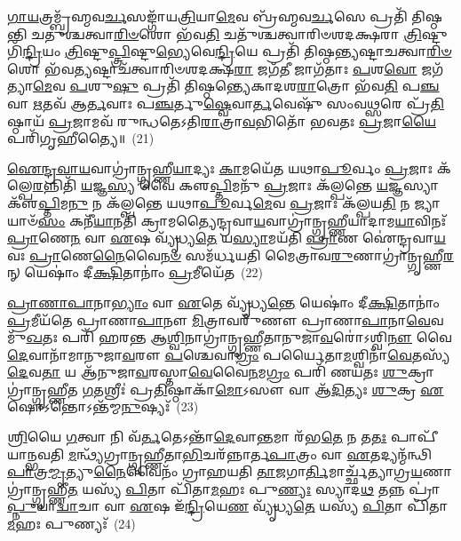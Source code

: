 \-\ul{𑌗𑌾}\-\-\ul{𑌯}\-𑌤𑍍𑌰𑌮𑍍𑌬𑍍𑌰᳴𑌹𑍍𑌮𑌵\-\ul{𑌰𑍍𑌚}\-𑌸𑌙𑍍𑌗𑌾᳴𑌯\-\ul{𑌤𑍍𑌰𑌿}\-𑌯𑌾\-\ul{𑌮𑍇}\-𑌵 𑌬𑍍𑌰᳴𑌹𑍍𑌮𑌵\-\ul{𑌰𑍍𑌚}\-𑌸𑍇 𑌪𑍍𑌰𑌤𑌿᳴ 𑌤𑌿𑌷𑍍𑌠𑌨𑍍𑌤𑌿 𑌚𑌤𑍁𑌶𑍍𑌚𑌤𑍍𑌵𑌾\-\ul{𑌰𑌿}\-\-\ul{𑍞}\-𑌶𑍋 𑌭᳴𑌵\-\ul{𑌤𑌿} 𑌚𑌤𑍁᳴𑌶𑍍𑌚𑌤𑍍𑌵𑌾𑌰𑌿𑍞𑌶𑌦𑌕𑍍𑌷𑌰𑌾 \ul{𑌤𑍍𑌰𑌿}\-𑌷𑍍𑌟𑍁𑌗𑌿᳴\-\ul{𑌨𑍍𑌦𑍍𑌰𑌿}\-𑌯𑌂 \ul{𑌤𑍍𑌰𑌿}\-𑌷𑍍𑌟𑍁\-\ul{𑌪𑍍𑌤𑍍𑌰𑌿}\-𑌷𑍍𑌟𑍁\-\ul{𑌭𑍍𑌯𑍇}\-𑌵𑍇\-\ul{𑌨𑍍𑌦𑍍𑌰𑌿}\-𑌯𑍇 𑌪𑍍𑌰𑌤𑌿᳴ 𑌤𑌿𑌷𑍍𑌠𑌨𑍍𑌤𑍍𑌯𑌷𑍍𑌟𑌾𑌚𑌤𑍍𑌵𑌾\-\ul{𑌰𑌿}\-\-\ul{𑍞}\-𑌶𑍋 𑌭᳴𑌵\-\ul{𑌤𑍍𑌯}\-𑌷𑍍𑌟𑌾𑌚᳴𑌤𑍍𑌵𑌾𑌰𑌿𑍞𑌶𑌦𑌕𑍍𑌷\-\ul{𑌰𑌾} 𑌜𑌗᳴\-\ul{𑌤𑍀} 𑌜𑌾𑌗᳴𑌤𑌾𑌃 \ul{𑌪}\-𑌶\-\ul{𑌵𑍋} 𑌜𑌗᳴𑌤𑍍𑌯𑌾\-\ul{𑌮𑍇}\-𑌵 \ul{𑌪}\-𑌶𑍁\-\ul{𑌷𑍁} 𑌪𑍍𑌰𑌤𑌿᳴ 𑌤𑌿𑌷𑍍𑌠𑌨𑍍𑌤𑍍𑌯𑍇𑌕𑌾𑌦𑌶\-\ul{𑌰𑌾}\-𑌤𑍍𑌰𑍋 𑌭᳴𑌵\-\ul{𑌤𑌿} 𑌪\-\ul{𑌞𑍍𑌚} 𑌵𑌾 \ul{𑌋}\-𑌤𑌵᳴ 𑌆\-\ul{𑌰𑍍𑌤}\-𑌵𑌾𑌃 𑌪\-\ul{𑌞𑍍𑌚}\-𑌰𑍍𑌤𑍁\-\ul{𑌷𑍍𑌵𑍇}\-𑌵𑌾\-\ul{𑌰𑍍𑌤}\-𑌵𑍇𑌷𑍁᳴ 𑌸𑌂𑌵\-\ul{𑌥𑍍𑌸}\-𑌰𑍇 𑌪𑍍𑌰᳴\-\ul{𑌤𑌿}\-𑌷𑍍𑌠𑌾𑌯᳴ \ul{𑌪𑍍𑌰}\-𑌜𑌾𑌮𑌵᳴ 𑌰𑍁𑌨𑍍𑌧𑌤𑍇\-𑌽𑌤𑌿\-\ul{𑌰𑌾}\-𑌤𑍍𑌰𑌾\-\ul{𑌵}\-𑌭𑌿𑌤𑍋᳴ 𑌭𑌵𑌤𑌃 \ul{𑌪𑍍𑌰}\-𑌜𑌾\-\ul{𑌯𑍈} 𑌪𑌰𑌿᳴𑌗𑍃𑌹𑍀𑌤𑍍𑌯𑍈॥~(21)

{\anuvakamend[{𑌤𑌸𑍍𑌮𑌾॑𑌦𑍍𑌗𑌾\-\ul{𑌯}\-𑌤𑍍𑌰𑍍𑌯𑍇\-\ul{𑌕𑌾}\-𑌨𑍍𑌨𑌪᳴\-\ul{𑌞𑍍𑌚𑌾}\-𑌶𑌚𑍍𑌚᳴}]}%

\-\ul{𑌐}\-\-\ul{𑌨𑍍𑌦𑍍𑌰}\-\-\ul{𑌵𑌾}\-\-\ul{𑌯}\-𑌵𑌾𑌗𑍍𑌰𑌾॑𑌨𑍍𑌗𑍃𑌹𑍍𑌣𑍀\-\ul{𑌯𑌾}\-𑌦𑍍𑌯𑌃 \ul{𑌕𑌾}\-𑌮𑌯𑍇᳴𑌤 𑌯𑌥𑌾\-\ul{𑌪𑍂}\-𑌰𑍍𑌵𑌂 \ul{𑌪𑍍𑌰}\-𑌜𑌾𑌃 𑌕᳴𑌲𑍍𑌪𑍇\-\ul{𑌰}\-𑌨𑍍𑌨𑌿𑌤𑌿᳴ \ul{𑌯}\-𑌜𑍍𑌞\-\ul{𑌸𑍍𑌯} 𑌵𑍈 𑌕𑍢\-\ul{𑌪𑍍𑌤𑌿}\-𑌮𑌨𑍁᳴ \ul{𑌪𑍍𑌰}\-𑌜𑌾𑌃 𑌕᳴𑌲𑍍𑌪𑌨𑍍𑌤𑍇 \ul{𑌯}\-𑌜𑍍𑌞𑌸𑍍𑌯𑌾𑌕𑍢᳴\-\ul{𑌪𑍍𑌤𑌿}\-𑌮\-\ul{𑌨𑍁} 𑌨 𑌕᳴𑌲𑍍𑌪𑌨𑍍𑌤𑍇 𑌯𑌥𑌾\-\ul{𑌪𑍂}\-𑌰𑍍𑌵\-\ul{𑌮𑍇}\-𑌵 \ul{𑌪𑍍𑌰}\-𑌜𑌾𑌃 𑌕᳴𑌲𑍍𑌪𑌯\-\ul{𑌤𑌿} 𑌨 𑌜𑍍𑌯𑌾𑌯𑌾𑍞᳴\-\ul{𑌸𑌂} 𑌕𑌨𑍀᳴\-\ul{𑌯𑌾}\-𑌨𑌤𑌿᳴ 𑌕𑍍𑌰𑌾𑌮𑌤𑍍𑌯𑍈𑌨𑍍𑌦𑍍𑌰𑌵𑌾\-\ul{𑌯}\-𑌵𑌾𑌗𑍍𑌰𑌾॑𑌨𑍍𑌗𑍃𑌹𑍍𑌣𑍀𑌯𑌾𑌦𑌾𑌮\-\ul{𑌯𑌾}\-𑌵𑌿𑌨𑌃᳴ \ul{𑌪𑍍𑌰𑌾}\-𑌣𑍇\-\ul{𑌨} 𑌵𑌾 \ul{𑌏}\-𑌷 𑌵𑍍𑌯𑍃᳴𑌧𑍍𑌯\-\ul{𑌤𑍇} 𑌯\-\ul{𑌸𑍍𑌯𑌾}\-𑌮𑌯᳴𑌤𑌿 \ul{𑌪𑍍𑌰𑌾}\-𑌣 𑌐॑𑌨𑍍𑌦𑍍𑌰𑌵𑌾\-\ul{𑌯}\-𑌵𑌃 \ul{𑌪𑍍𑌰𑌾}\-𑌣𑍇\-\ul{𑌨𑍈}\-𑌵𑍈\-\ul{𑌨}\-\-\ul{𑍞} 𑌸𑌮᳴𑌰𑍍𑌧𑌯𑌤𑌿 𑌮𑍈𑌤𑍍𑌰𑌾𑌵\-\ul{𑌰𑍁}\-𑌣𑌾𑌗𑍍𑌰𑌾॑𑌨𑍍𑌗𑍃𑌹𑍍𑌣𑍀\-\ul{𑌰}\-𑌨𑍍 𑌯𑍇𑌷𑌾𑌂॑ 𑌦𑍀\-\ul{𑌕𑍍𑌷𑌿}\-𑌤𑌾𑌨𑌾𑌂॑ \ul{𑌪𑍍𑌰}\-𑌮𑍀𑌯𑍇᳴𑌤~(22)

\-\ul{𑌪𑍍𑌰𑌾}\-\-\ul{𑌣𑌾}\-\-\ul{𑌪𑌾}\-𑌨𑌾\-\ul{𑌭𑍍𑌯𑌾𑌂} 𑌵𑌾 \ul{𑌏}\-𑌤𑍇 𑌵𑍍𑌯𑍃᳴𑌧𑍍𑌯\-\ul{𑌨𑍍𑌤𑍇} 𑌯𑍇𑌷𑌾𑌂॑ 𑌦𑍀\-\ul{𑌕𑍍𑌷𑌿}\-𑌤𑌾𑌨𑌾𑌂॑ \ul{𑌪𑍍𑌰}\-𑌮𑍀𑌯᳴𑌤𑍇 𑌪𑍍𑌰𑌾𑌣𑌾\-\ul{𑌪𑌾}\-𑌨𑍗 \ul{𑌮𑌿}\-𑌤𑍍𑌰𑌾𑌵𑌰𑍁᳴𑌣𑍗 𑌪𑍍𑌰𑌾𑌣𑌾\-\ul{𑌪𑌾}\-𑌨𑌾\-\ul{𑌵𑍇}\-𑌵 𑌮𑍁᳴\-\ul{𑌖}\-𑌤𑌃 𑌪𑌰𑌿᳴ 𑌹𑌰𑌨𑍍𑌤 𑌆\-\ul{𑌶𑍍𑌵𑌿}\-𑌨𑌾𑌗𑍍𑌰𑌾॑𑌨𑍍𑌗𑍃𑌹𑍍𑌣𑍀𑌤𑌾𑌨𑍁𑌜𑌾\-\ul{𑌵}\-𑌰𑍋॑\-𑌽𑌶𑍍𑌵𑌿\-\ul{𑌨𑍗} 𑌵𑍈 \ul{𑌦𑍇}\-𑌵𑌾𑌨𑌾᳴𑌮𑌾𑌨𑍁𑌜𑌾\-\ul{𑌵}\-𑌰𑍗 \ul{𑌪}\-𑌶𑍍𑌚𑍇𑌵𑌾\-\ul{𑌗𑍍𑌰𑌂} 𑌪𑌰𑍍𑌯𑍈𑌤𑌾\-\ul{𑌮}\-𑌶𑍍𑌵𑌿𑌨𑌾᳴\-\ul{𑌵𑍇}\-𑌤𑌸𑍍𑌯᳴ \ul{𑌦𑍇}\-𑌵\-\ul{𑌤𑌾} 𑌯 𑌆᳴𑌨𑍁𑌜𑌾\-\ul{𑌵}\-𑌰𑌸𑍍𑌤𑌾\-\ul{𑌵𑍇}\-𑌵𑍈\-\ul{𑌨}\-𑌮\-\ul{𑌗𑍍𑌰𑌂} 𑌪𑌰𑌿᳴ 𑌣𑌯𑌤𑌃 \ul{𑌶𑍁}\-𑌕𑍍𑌰𑌾𑌗𑍍𑌰𑌾॑𑌨𑍍𑌗𑍃𑌹𑍍𑌣𑍀𑌤 \ul{𑌗}\-𑌤𑌶𑍍𑌰𑍀𑌃॑ 𑌪𑍍𑌰\-\ul{𑌤𑌿}\-𑌷𑍍𑌠𑌾𑌕𑌾᳴\-\ul{𑌮𑍋}\-\-𑌽𑌸𑍗 𑌵𑌾 𑌆᳴\-\ul{𑌦𑌿}\-𑌤𑍍𑌯𑌃 \ul{𑌶𑍁}\-𑌕𑍍𑌰 \ul{𑌏}\-𑌷𑍋\-𑌽𑌨𑍍𑌤𑍋\-𑌽𑌨𑍍𑌤᳴𑌮𑍍𑌮\-\ul{𑌨𑍁}\-𑌷𑍍𑌯𑌃᳴~(23)

\-\ul{𑌶𑍍𑌰𑌿}\-𑌯𑍈 \ul{𑌗}\-𑌤𑍍𑌵𑌾 𑌨𑌿 𑌵᳴\-\ul{𑌰𑍍𑌤}\-𑌤𑍇\-𑌽𑌨𑍍𑌤𑌾᳴\-\ul{𑌦𑍇}\-𑌵𑌾\-\ul{𑌨𑍍𑌤}\-𑌮𑌾 𑌰᳴𑌭\-\ul{𑌤𑍇} 𑌨 𑌤\-\ul{𑌤𑌃} 𑌪𑌾𑌪𑍀᳴𑌯𑌾𑌨𑍍𑌭𑌵𑌤𑌿 \ul{𑌮}\-𑌨𑍍𑌥𑍍𑌯᳴𑌗𑍍𑌰𑌾𑌨𑍍𑌗𑍃𑌹𑍍𑌣𑍀𑌤𑌾\-\ul{𑌭𑌿}\-𑌚𑌰᳴𑌨𑍍𑌨𑌾𑌰𑍍𑌤\-\ul{𑌪𑌾}\-𑌤𑍍𑌰𑌂 𑌵𑌾 \ul{𑌏}\-𑌤𑌦𑍍𑌯𑌨𑍍𑌮᳴𑌨𑍍𑌥𑌿\-\ul{𑌪𑌾}\-𑌤𑍍𑌰\-\ul{𑌮𑍍𑌮𑍃}\-𑌤𑍍𑌯𑍁\-\ul{𑌨𑍈}\-𑌵𑍈𑌨𑌂᳴ 𑌗𑍍𑌰𑌾𑌹𑌯𑌤𑌿 \ul{𑌤𑌾}\-𑌜𑌗𑌾\-\ul{𑌰𑍍𑌤𑌿}\-𑌮𑌾𑌰𑍍𑌚𑍍𑌛᳴𑌤𑍍𑌯𑌾𑌗𑍍𑌰\-\ul{𑌯}\-𑌣𑌾𑌗𑍍𑌰𑌾॑𑌨𑍍𑌗𑍃𑌹𑍍𑌣𑍀\-\ul{𑌤} 𑌯𑌸𑍍𑌯᳴ \ul{𑌪𑌿}\-𑌤𑌾 𑌪𑌿᳴𑌤𑌾\-\ul{𑌮}\-𑌹𑌃 𑌪𑍁\-\ul{𑌣𑍍𑌯𑌃} 𑌸𑍍𑌯𑌾𑌦\-\ul{𑌥} 𑌤𑌨𑍍𑌨 𑌪𑍍𑌰𑌾॑\-\ul{𑌪𑍍𑌨𑍁}\-𑌯𑌾\-\ul{𑌦𑍍𑌵𑌾}\-𑌚𑌾 𑌵𑌾 \ul{𑌏}\-𑌷 𑌇᳴\-\ul{𑌨𑍍𑌦𑍍𑌰𑌿}\-𑌯𑍇\-\ul{𑌣} 𑌵𑍍𑌯𑍃᳴𑌧𑍍𑌯\-\ul{𑌤𑍇} 𑌯𑌸𑍍𑌯᳴ \ul{𑌪𑌿}\-𑌤𑌾 𑌪𑌿᳴𑌤𑌾\-\ul{𑌮}\-𑌹𑌃 𑌪𑍁𑌣𑍍𑌯𑌃᳴~(24)

